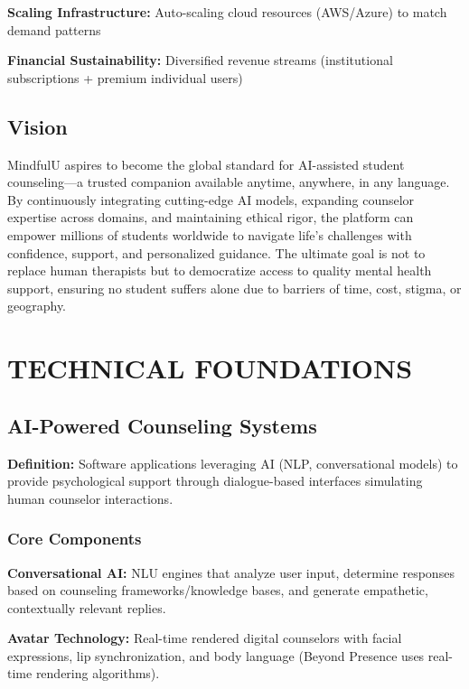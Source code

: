 \documentclass[11pt,a4paper]{report}
\begin{document}
\textbf{Scaling Infrastructure:} Auto-scaling cloud resources (AWS/Azure) to match demand patterns

\textbf{Financial Sustainability:} Diversified revenue streams (institutional subscriptions + premium individual users)

\section{Vision}
MindfulU aspires to become the global standard for AI-assisted student counseling---a trusted companion available anytime, anywhere, in any language. By continuously integrating cutting-edge AI models, expanding counselor expertise across domains, and maintaining ethical rigor, the platform can empower millions of students worldwide to navigate life's challenges with confidence, support, and personalized guidance. The ultimate goal is not to replace human therapists but to democratize access to quality mental health support, ensuring no student suffers alone due to barriers of time, cost, stigma, or geography.

\chapter{TECHNICAL FOUNDATIONS}

\section{AI-Powered Counseling Systems}

\textbf{Definition:} Software applications leveraging AI (NLP, conversational models) to provide psychological support through dialogue-based interfaces simulating human counselor interactions.

\subsection{Core Components}

\textbf{Conversational AI:} NLU engines that analyze user input, determine responses based on counseling frameworks/knowledge bases, and generate empathetic, contextually relevant replies.

\textbf{Avatar Technology:} Real-time rendered digital counselors with facial expressions, lip synchronization, and body language (Beyond Presence uses real-time rendering algorithms).
\end{document}
